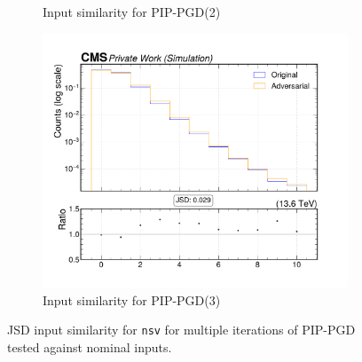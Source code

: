 \begin{figure}[htbp]
\begin{subfigure}[t]{0.32\textwidth}
    \caption*{Input similarity for PIP-PGD(2)}
  \end{subfigure}\hfill
  \begin{subfigure}[t]{0.32\textwidth}
    \includegraphics[width=\linewidth]{media/output/features/compare/combined_it_3/cmp_global_features_nsv.pdf}
    \caption*{Input similarity for PIP-PGD(3)}
  \end{subfigure}

  \caption*{JSD input similarity for \texttt{nsv} for multiple iterations of PIP-PGD tested against nominal inputs.}
  \label{fig:combined_input_nsv}
\end{figure}

